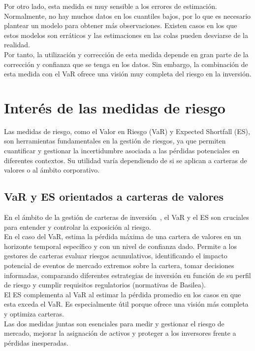 \documentclass[11pt]{book}
\theoremstyle{plain} %
\theoremstyle{definition} %
\begin{document}
Por otro lado, esta medida es muy sensible a los errores de estimación. 
Normalmente, no hay muchos datos en los cuantiles bajos, por lo que es 
necesario plantear un modelo para obtener más observaciones. Existen casos en los 
que estos modelos son erráticos y las estimaciones en las colas pueden desviarse de 
la realidad.\\

Por tanto, la utilización y corrección de esta medida depende en gran parte 
de la corrección y confianza que se tenga en los datos. Sin embargo, 
la combinación de esta medida con el VaR ofrece una visión muy 
completa del riesgo en la inversión.

\section{Interés de las medidas de riesgo}
Las medidas de riesgo, como el Valor en Riesgo (VaR) y Expected Shortfall (ES), 
son herramientas fundamentales en la gestión de riesgos, ya que permiten 
cuantificar y gestionar la incertidumbre asociada a las pérdidas potenciales 
en diferentes contextos. Su utilidad varía dependiendo de si se aplican a 
carteras de valores o al ámbito corporativo.
\subsection{VaR y ES orientados a carteras de valores}
En el ámbito de la gestión de carteras de inversión~\cite{SSU}, el VaR y el ES son 
cruciales para entender y controlar la exposición al riesgo.\\

En el caso del VaR, estima la pérdida máxima de una cartera de valores 
en un horizonte temporal específico y con un nivel de confianza dado. 
Permite a los gestores de carteras evaluar riesgos acumulativos, 
identificando el impacto potencial de eventos de mercado extremos sobre 
la cartera, tomar decisiones informadas, comparando diferentes estrategias 
de inversión en función de su perfil de riesgo y cumplir requisitos 
regulatorios (normativas de Basilea).\\

El ES complementa al VaR al estimar la pérdida promedio en los casos en 
que esta exceda el VaR. Es especialmente útil porque ofrece una visión más 
completa y optimiza carteras.\\

Las dos medidas juntas son esenciales para medir y gestionar el riesgo de 
mercado, mejorar la asignación de activos y proteger a los inversores frente 
a pérdidas inesperadas.
\end{document}

